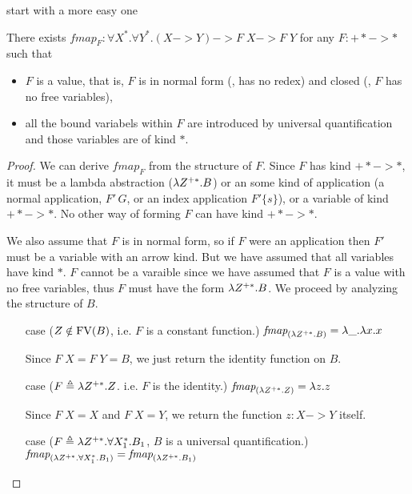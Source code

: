start with a more easy one
\begin{proposition}\label{prop:fixi:fmapBaseCase}
There exists
$\textit{fmap}_F : \forall X^{*}.\forall Y^{*}.(X -> Y) -> F\;X -> F\;Y$
for any $F : +* -> *$ such that
\begin{itemize}
        \item $F$ is a value, that is, $F$ is
                in normal form (\ie, has no redex) and
                closed (\ie, $F$ has no free variables),
        \item all the bound variabels within $F$ are
                introduced by universal quantification
                and those variables are of kind $*$.
\end{itemize}
\end{proposition}
\begin{proof}
        We can derive $\textit{fmap}_F$ from the structure of $F$.
        Since $F$ has kind $+* -> *$, it must be a lambda abstraction
        ($\lambda Z^{+*}.B$) or an some kind of application 
        (a normal application, $F'\,G$, or an index application $F'\{s\}$),
        or a variable of kind $+* -> *$.
        No other way of forming $F$ can have kind $+* -> *$.
        
        We also assume that $F$ is in normal form, so if $F$ were an application
        then $F'$ must be a variable with an arrow kind. But we have assumed that
        all variables have kind $*$. $F$ cannot be a varaible since we have
        assumed that $F$ is a value with no free variables, thus $F$ must have the form $\lambda Z^{+*}.B$. We
        proceed by analyzing the structure of $B$.
 
\begin{itemize}
\item[case]($Z\notin \mathop{\mathrm{FV}}(B)$, i.e. $F$ is a constant function.)
        $ \textit{fmap}_{(\lambda Z^{+*}. B)} = \lambda \_ . \lambda x. x $

        Since $F\;X = F\;Y = B$, we just return the identity function on $B$.

\item[case]($F \triangleq \lambda Z^{+*}. Z$. i.e. $F$ is the identity.)
        $ \textit{fmap}_{(\lambda Z^{+*}. Z)} = \lambda z . z $

        Since $F\;X = X$ and $F\;X = Y$,
        we return the function $z:X -> Y$ itself.

\item[case]($F \triangleq \lambda Z^{+*}. \forall X_1^{*} .B_1$, $B$ is a universal quantification.)
        $\textit{fmap}_{(\lambda Z^{+*}. \forall X_1^{*} .B_1)}
        = \textit{fmap}_{(\lambda Z^{+*}.B_1)}$


\end{itemize}
\end{proof}

